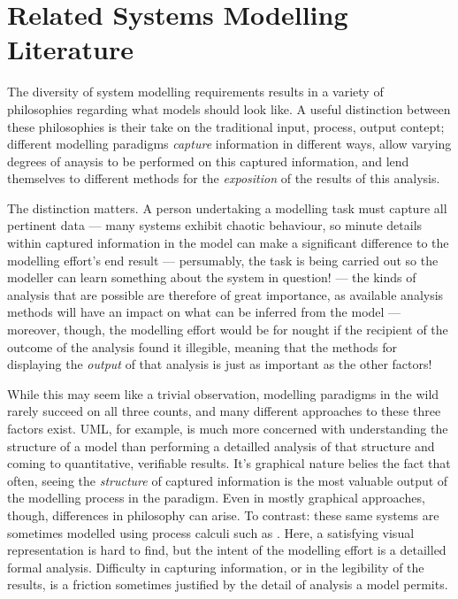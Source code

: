 \documentclass[draft]{report}
\begin{document}





\section{Related Systems Modelling Literature}
\label{sec:literature}
The diversity of system modelling requirements results in a variety of
philosophies regarding what models should look like. A useful distinction
between these philosophies is their take on the traditional input, process,
output contept; different modelling paradigms \emph{capture} information in
different ways, allow varying degrees of anaysis to be performed on this
captured information, and lend themselves to different methods for the
\emph{exposition} of the results of this analysis.\par

The distinction matters. A person undertaking a modelling task must capture all
pertinent data --- many systems exhibit chaotic behaviour, so minute details
within captured information in the model can make a significant difference to
the modelling effort's end result --- persumably, the task is being carried out
so the modeller can learn something about the system in question! --- the kinds
of analysis that are possible are therefore of great importance, as available
analysis methods will have an impact on what can be inferred from the model ---
moreover, though, the modelling effort would be for nought if the recipient of
the outcome of the analysis found it illegible, meaning that the methods for
displaying the \emph{output} of that analysis is just as important as the other
factors!\par

While this may seem like a trivial observation, modelling paradigms in the wild
rarely succeed on all three counts, and many different approaches to these three
factors exist. UML, for example, is much more concerned with understanding the
structure of a model than performing a detailled analysis of that structure and
coming to quantitative, verifiable results. It's graphical nature belies the
fact that often, seeing the \emph{structure} of captured information is the most
valuable output of the modelling process in the paradigm. Even in mostly
graphical approaches, though, differences in philosophy can arise. To contrast:
these same systems are sometimes modelled using process calculi such as
\picalculus. Here, a satisfying visual representation is hard to find, but the
intent of the modelling effort is a detailled formal analysis. Difficulty in
capturing information, or in the legibility of the results, is a friction
sometimes justified by the detail of analysis a model permits. \par
\end{document}
